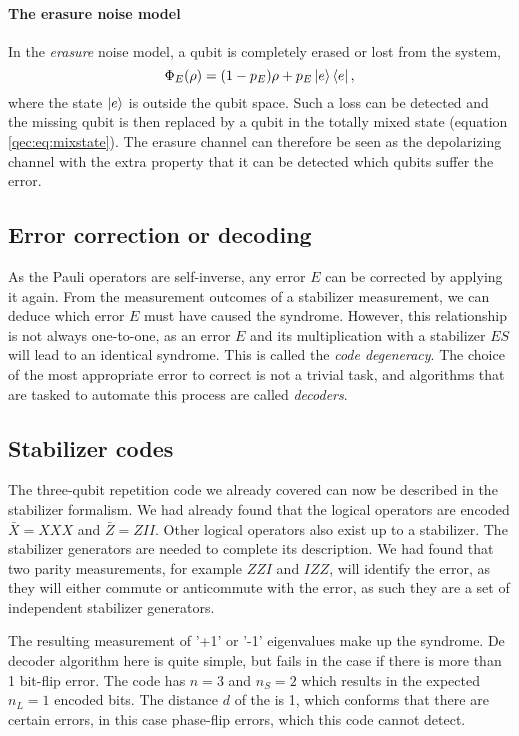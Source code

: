 \paragraph{The erasure noise model}
In the \emph{erasure} noise model, a qubit is completely erased or lost from the system,
\begin{equation}\label{qec:eq:erasure}
  \Phi_E(\rho) = (1-p_E)\rho + p_E\ket{e}\bra{e},
\end{equation}
where the state $\ket{e}$ is outside the qubit space. Such a loss can be detected and the missing qubit is then replaced by a qubit in the totally mixed state (equation \eqref{qec:eq:mixstate}). The erasure channel can therefore be seen as the depolarizing channel with the extra property that it can be detected which qubits suffer the error.


\subsection{Error correction or decoding}

As the Pauli operators are self-inverse, any error $E$ can be corrected by applying it again. From the measurement outcomes of a stabilizer measurement, we can deduce which error $E$ must have caused the syndrome. However, this relationship is not always one-to-one, as an error $E$ and its multiplication with a stabilizer $ES$ will lead to an identical syndrome. This is called the \emph{code degeneracy}. The choice of the most appropriate error to correct is not a trivial task, and algorithms that are tasked to automate this process are called \emph{decoders}.

\subsection{Stabilizer codes}

The three-qubit repetition code we already covered can now be described in the stabilizer formalism. We had already found that the logical operators are encoded $\bar{X} = XXX$ and $\bar{Z} = ZII$. Other logical operators also exist up to a stabilizer. The stabilizer generators are needed to complete its description. We had found that two parity measurements, for example $ZZI$ and $IZZ$, will identify the error, as they will either commute or anticommute with the error, as such they are a set of independent stabilizer generators. 

The resulting measurement of '+1' or '-1' eigenvalues make up the syndrome. De decoder algorithm here is quite simple, but fails in the case if there is more than 1 bit-flip error. The code has $n=3$ and $n_S=2$ which results in the expected $n_L = 1$ encoded bits. The distance $d$ of the is 1, which conforms that there are certain errors, in this case phase-flip errors, which this code cannot detect.

